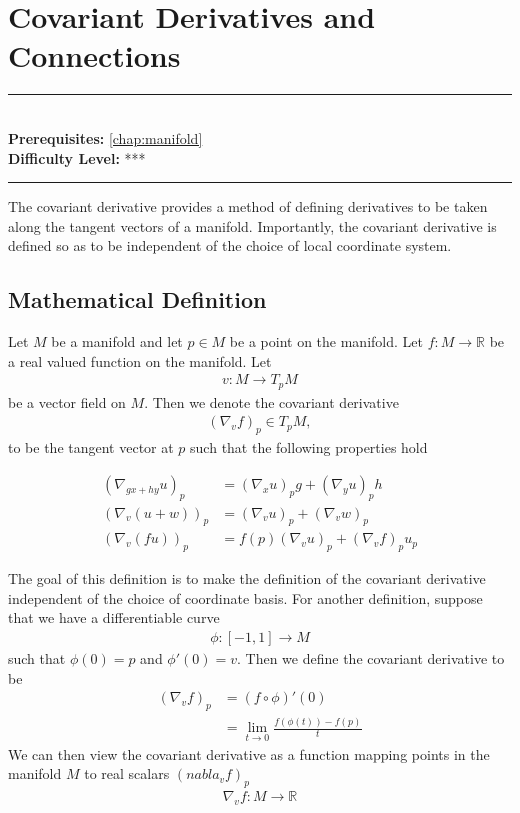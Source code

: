 \documentclass[book.tex]{subfiles}
\begin{document}
\chapter{Covariant Derivatives and Connections}
\label{chap:covariant_derivative}
\noindent\rule{11cm}{0.4pt} \\
\textbf{Prerequisites:} \autoref{chap:manifold} \\
\textbf{Difficulty Level:} *** \\
\noindent\rule{11cm}{0.4pt}
\vspace{5mm}

The covariant derivative provides a method of defining derivatives to be taken along the tangent vectors of a manifold. Importantly, the covariant derivative is defined so as to be independent of the choice of local coordinate system. 

\section{Mathematical Definition}

Let $M$ be a manifold and let $p \in M$ be a point on the manifold. Let $f: M \to \mathbb{R}$ be a real valued function on the manifold. Let 
\begin{align}
v : M \to T_p M
\end{align}
be a vector field on $M$. Then we denote the covariant derivative 
\begin{align}
(\nabla_v f)_p \in T_p M,
\end{align}
to be the tangent vector at $p$ such that the following properties hold

\begin{align}
(\nabla_{gx + hy} u)_p &= (\nabla_x u)_p g + (\nabla_y u)_p h \\
(\nabla_v (u + w))_p &= (\nabla_v u)_p + (\nabla_v w)_p \\
(\nabla_v (fu))_p &= f(p)(\nabla_v u)_p  + (\nabla_v f)_p u_p
\end{align}

The goal of this definition is to make the definition of the covariant derivative independent of the choice of coordinate basis. For another definition, suppose that we have a differentiable curve
\begin{align}
\phi:[-1, 1] \to M
\end{align}
such that $\phi(0) = p$ and $\phi'(0) = v$. Then we define the covariant derivative to be
\begin{align}
(\nabla_v f)_p &= (f \circ \phi)'(0) \\
&= \lim_{t \to 0} \frac{f(\phi(t)) - f(p)}{t}
\end{align}
We can then view the covariant derivative as a function mapping points in the manifold $M$ to real scalars $(nabla_v f)_p$
\begin{align}
\nabla_v f: M \to \mathbb{R}
\end{align}

\end{document}
